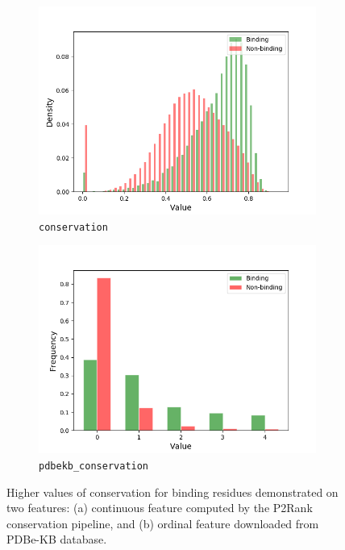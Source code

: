 \begin{figure}[!h]
\centering
\begin{subfigure}{.5\textwidth}
  \centering
  \includegraphics[width=1\linewidth]{../img/conservation_hist.png}
  \caption{\texttt{conservation}}
\end{subfigure}%
\begin{subfigure}{.5\textwidth}
  \centering
  \includegraphics[width=1\linewidth]{../img/pdbekb_conservation_frequencies.png}
  \caption{\texttt{pdbekb\_conservation}}
\end{subfigure}
\caption[Conservation features]{Higher values of conservation for binding residues demonstrated on two features: (a) continuous feature computed by the P2Rank conservation pipeline, and (b) ordinal feature downloaded from PDBe-KB database.}
\label{fig:conservation}
\end{figure}

